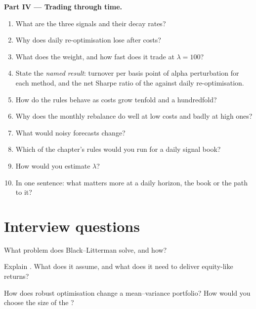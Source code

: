 \begin{problem}
\medskip\noindent\textbf{Part IV --- Trading through time.}
\begin{enumerate}[resume]
\item What are the three signals and their decay rates?
\item Why does daily re-optimisation lose after costs?
\item What does the  weight, and how fast does it trade at $\lambda = 100$?
\item State the \emph{named result}: turnover per basis point of alpha perturbation for each method, and the net Sharpe ratio of the  against daily
re-optimisation.
\item How do the rules behave as costs grow tenfold and a hundredfold?
\item Why does the monthly rebalance do well at low costs and badly at high ones?
\item What would noisy forecasts change?
\item Which of the chapter's rules would you run for a daily signal book?
\item How would you estimate $\lambda$?
\item In one sentence: what matters more at a daily horizon, the book or the path to it?
\end{enumerate}
\end{problem}

\section{Interview questions}

\begin{interviewq}\label{iq:rs:portfolio-construction-ii:1}
What problem does Black--Litterman solve, and how?
\end{interviewq}

\begin{interviewq}\label{iq:rs:portfolio-construction-ii:2}
Explain . What does it assume, and what does it need to deliver equity-like returns?
\end{interviewq}

\begin{interviewq}\label{iq:rs:portfolio-construction-ii:3}
How does robust optimisation change a mean--variance portfolio? How would you choose the size of the ?
\end{interviewq}

